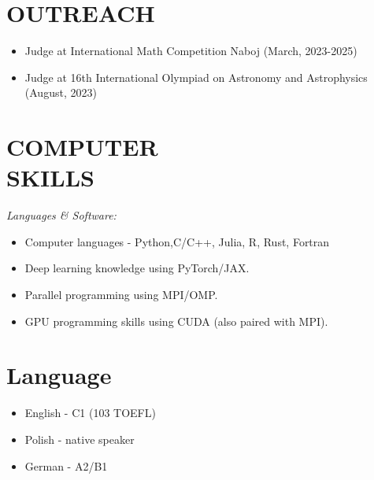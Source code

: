 \documentclass[margin, 10pt]{res} %
\begin{document}
\begin{resume}
\section{OUTREACH}
    \begin{itemize}
        \item Judge at International Math Competition Naboj (March, 2023-2025)
        \item Judge at 16th International Olympiad on Astronomy and Astrophysics (August, 2023)

    \end{itemize}

\section{COMPUTER \\ SKILLS}

{\sl Languages \& Software:}
\begin{itemize}
    \item Computer languages - Python,C/C++, Julia, R, Rust, Fortran
    \item Deep learning knowledge using PyTorch/JAX.
    \item Parallel programming using MPI/OMP.
    \item GPU programming skills using CUDA (also paired with MPI).
\end{itemize}


\section{Language}
\begin{itemize}
    \item English - C1 (103 TOEFL)
    \item Polish - native speaker
    \item German - A2/B1
\end{itemize}

\end{resume}
\end{document}

